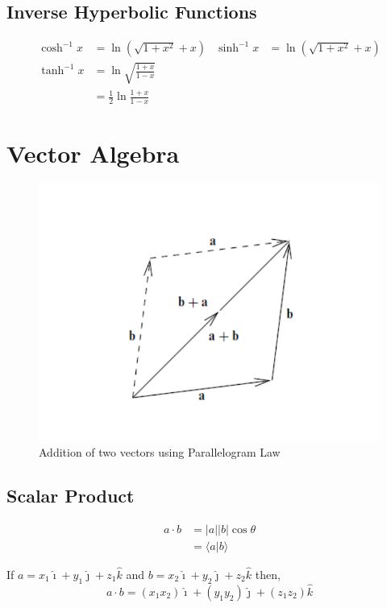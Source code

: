 \documentclass[12pt]{article}
\begin{document}
\subsection{Inverse Hyperbolic Functions}
\begin{align*}
\cosh^{-1}x &= \ln{(\sqrt{1 + x^2} + x)} & \sinh^{-1}x &= \ln{(\sqrt{1 + x^2} + x)} \\
\tanh^{-1}x &= \ln{\sqrt{\frac{1 + x}{1 - x}}} \\
&= \frac{1}{2}\ln{\frac{1+x}{1-x}}
\end{align*}

\section{Vector Algebra}
\begin{figure}[H]
	\centering
	\includegraphics[scale=1]{vector_add.pdf}
	\caption{\label{vector_add} Addition of two vectors using Parallelogram Law}
\end{figure}
\subsection{Scalar Product}

\begin{align*}
a \cdot b &= \lvert a \rvert \lvert b \rvert \cos\theta \\
&= \langle a |b \rangle
\end{align*}

If $a = x_1 \hat{\imath} + y_1 \hat{\jmath} + z_1 \hat{k}$ and $b = x_2 \hat{\imath} + y_2 \hat{\jmath} + z_2 \hat{k}$ then, 	 
$$a \cdot b = (x_1 x_2)\hat{\imath} + (y_1 y_2)\hat{\jmath} + (z_1 z_2)\hat{k}$$
\end{document}

